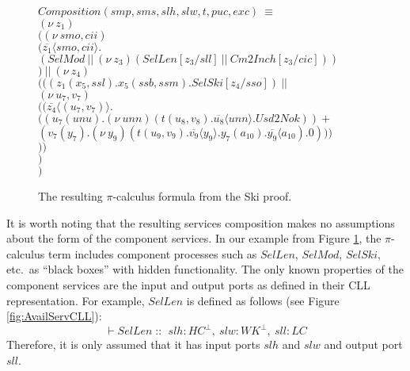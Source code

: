 \documentclass[copyright,creativecommons]{eptcs}
\DeclareMathOperator{\cc}{::\ }
\DeclareMathOperator{\cln}{:}
\begin{document}
\begin{figure}[tbp]
\centering
\begin{minipage}{.65\linewidth}
\begin{flushleft}
\hspace*{0mm}  $Composition(smp,sms,slh,slw,t,puc,exc)\ \equiv$ \\
\hspace*{5mm}  $(\nu\ z_1)$ \\
\hspace*{10mm}  $  ((\nu\ smo,cii)$ \\
\hspace*{15mm} $    (\overline{z_1}\langle smo,cii\rangle.$ \\
\hspace*{15mm} $    (SelMod\ ||\ (\nu\ z_3)(SelLen[z_3/sll]\ ||\ Cm2Inch[z_3/cic])) $\\
\hspace*{10mm}  $  )\ ||\ (\nu\ z_4) $\\
\hspace*{15mm} $    (((z_1(x_5,ssl).x_5(ssb,ssm).SelSki[z_4/sso])\ ||\   $\\
\hspace*{15mm} $    (\nu\ u_7,v_7)$\\
\hspace*{20mm} $      ((\overline{z_4}\langle (u_7,v_7)\rangle. $\\
\hspace*{25mm} $        ((u_7(unu).(\nu\ unn)(t(u_8,v_8).\overline{u_8}\langle unn \rangle.Usd2Nok)) + $\\
\hspace*{30mm} $    (v_7(y_7).(\nu\ y_9)(t(u_9,v_9).\overline{v_9}\langle y_9\rangle.y_7(a_{10}).\overline{y_9}\langle a_{10}).0))) $\\
\hspace*{15mm} $))$ \\
\hspace*{10mm}  $)$\\
\hspace*{5mm}  $)$\\
  \end{flushleft}
  \end{minipage}
	\caption{The resulting $\pi$-calculus formula from the Ski proof.}
	\label{fig:SkiPiResult}
\end{figure}



It is worth noting that the resulting services composition makes no assumptions about the form of the component services. In our example from Figure \ref{fig:SkiPiResult}, the $\pi$-calculus term includes component processes such as $SelLen$, $SelMod$, $SelSki$, etc.\ as ``black boxes'' with hidden functionality. The only known properties of the component services are the input and output ports as defined in their CLL representation. For example, $SelLen$ is defined as follows (see Figure \ref{fig:AvailServCLL}):
\[
\vdash SelLen \cc slh \cln HC^\bot,\ slw \cln WK^\bot,\ sll \cln LC
\]
Therefore, it is only assumed that it has input ports $slh$ and $slw$ and output port $sll$.
\end{document}
